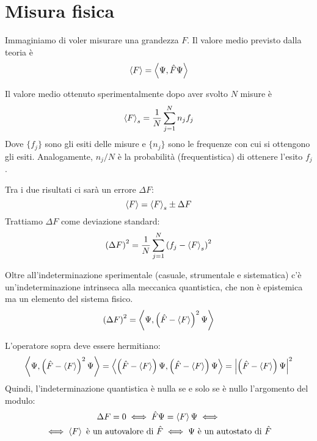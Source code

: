\section{Misura fisica}

Immaginiamo di voler misurare una grandezza $F$.
Il valore medio previsto dalla teoria è
\begin{equation}
    \left\langle F \right\rangle = \left\langle \Psi, \hat{F}\Psi \right\rangle
\end{equation}

Il valore medio ottenuto sperimentalmente dopo aver svolto $N$ misure è
\begin{equation}
    \left\langle F \right\rangle_s = \frac{1}{N} \sum_{j = 1}^N n_j f_j
\end{equation}
Dove $\{f_j\}$ sono gli esiti delle misure e $\{n_j\}$ sono le frequenze con cui si ottengono gli esiti.
Analogamente, $n_j / N$ è la probabilità (frequentistica) di ottenere l'esito $f_j$.

Tra i due risultati ci sarà un errore $\Delta F$:
\begin{equation}
    \left\langle F \right\rangle = \left\langle F \right\rangle_s \pm \Delta F
\end{equation}
Trattiamo $\Delta F$ come deviazione standard:
\begin{equation}
    \left( \Delta F \right)^2 = \frac{1}{N} \sum_{j = 1}^N \left( f_j - \left\langle F \right\rangle_s \right)^2
\end{equation}

Oltre all'indeterminazione sperimentale (casuale, strumentale e sistematica) c'è un'indeterminazione intrinseca alla meccanica quantistica, che non è epistemica ma un elemento del sistema fisico.
\begin{equation}
    \left( \Delta F \right)^2 = \left\langle \Psi, \left( \hat{F} - \left\langle F \right\rangle \right)^2 \Psi \right\rangle
\end{equation}

L'operatore sopra deve essere hermitiano:
\begin{equation}
    \left\langle \Psi, \left( \hat{F} - \left\langle F \right\rangle \right)^2 \Psi \right\rangle
    = \left\langle \left( \hat{F} - \left\langle F \right\rangle \right) \Psi, \left( \hat{F} - \left\langle F \right\rangle \right) \Psi \right\rangle
    = \left\lvert \left( \hat{F} - \left\langle F \right\rangle \right) \Psi \right\rvert^2
\end{equation}
Quindi, l'indeterminazione quantistica è nulla se e solo se è nullo l'argomento del modulo:
\begin{equation}
\label{eq:indeterminazione_nulla}
\begin{gathered}
    \Delta F = 0
    \iff \hat{F} \Psi = \left\langle F \right\rangle \Psi \iff \\
    \iff \left\langle F \right\rangle \text{ è un autovalore di } \hat{F}
    \iff \Psi \text{ è un autostato di } \hat{F}
\end{gathered}
\end{equation}

